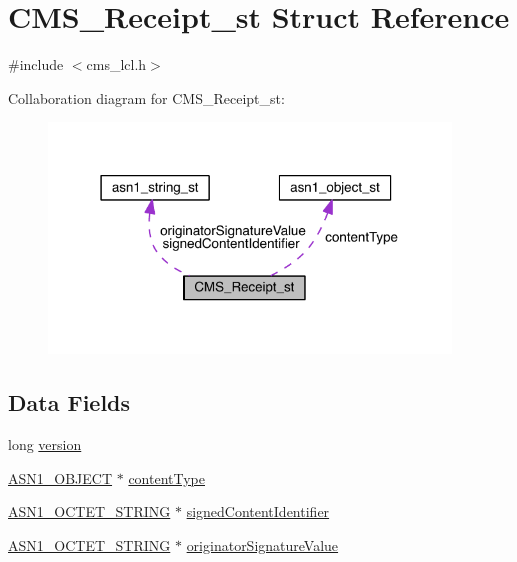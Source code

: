\hypertarget{struct_c_m_s___receipt__st}{}\section{C\+M\+S\+\_\+\+Receipt\+\_\+st Struct Reference}
\label{struct_c_m_s___receipt__st}


{\ttfamily \#include $<$cms\+\_\+lcl.\+h$>$}



Collaboration diagram for C\+M\+S\+\_\+\+Receipt\+\_\+st\+:\nopagebreak
\begin{figure}[H]
\begin{center}
\leavevmode
\includegraphics[width=303pt]{struct_c_m_s___receipt__st__coll__graph}
\end{center}
\end{figure}
\subsection*{Data Fields}
\begin{DoxyCompactItemize}
\item 
long \hyperlink{struct_c_m_s___receipt__st_a17afc5cf84cee4b2123665f28ce85c9f}{version}
\item 
\hyperlink{crypto_2ossl__typ_8h_ae3fda0801e4c8e250087052bafb3ce2e}{A\+S\+N1\+\_\+\+O\+B\+J\+E\+CT} $\ast$ \hyperlink{struct_c_m_s___receipt__st_af82a0c3993f8e0dc4a321794538ce00d}{content\+Type}
\item 
\hyperlink{crypto_2ossl__typ_8h_afbd05e94e0f0430a2b729473efec88c1}{A\+S\+N1\+\_\+\+O\+C\+T\+E\+T\+\_\+\+S\+T\+R\+I\+NG} $\ast$ \hyperlink{struct_c_m_s___receipt__st_aee60f8592bd6dfe669df11513f67a74a}{signed\+Content\+Identifier}
\item 
\hyperlink{crypto_2ossl__typ_8h_afbd05e94e0f0430a2b729473efec88c1}{A\+S\+N1\+\_\+\+O\+C\+T\+E\+T\+\_\+\+S\+T\+R\+I\+NG} $\ast$ \hyperlink{struct_c_m_s___receipt__st_a063fd09dae9d4cb2f1086f06810b4145}{originator\+Signature\+Value}
\end{DoxyCompactItemize}


